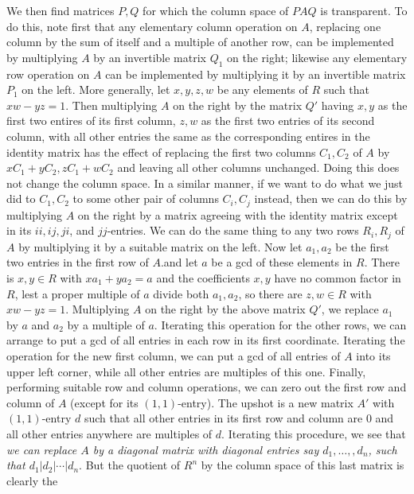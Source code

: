 \documentclass[10pt]{article}
\begin{document}
We then find matrices $P,Q$ for which the column space of $PAQ$ is
transparent. To do this, note first that any elementary column operation
on $A$, replacing one column by the sum of itself and a multiple of
another row, can be implemented by multiplying $A$ by an invertible
matrix $Q_1$ on the right; likewise any elementary row operation on $A$
can be implemented by multiplying it by an invertible matrix $P_1$ on
the left. More generally, let $x,y,z,w$ be any elements of $R$ such that
$xw - yz = 1$. Then multiplying $A$ on the right by the matrix $Q'$
having $x,y$ as the first two entires of its first column, $z,w$ as the
first two entries of its second column, with all other entries the same
as the corresponding entires in the identity matrix has the effect of
replacing the first two columns $C_1,C_2$ of $A$ by
$xC_1+yC_2,zC_1+wC_2$ and leaving all other columns unchanged. Doing
this does not change the column space. In a similar manner, if we want
to do what we just did to $C_1,C_2$ to some other pair of columns
$C_i,C_j$ instead, then we can do this by multiplying $A$ on the right
by a matrix agreeing with the identity matrix except in its $ii,ij,ji$,
and $jj$-entries. We can do the same thing to any two rows $R_i,R_j$ of
$A$ by multiplying it by a suitable matrix on the left. Now let
$a_1,a_2$ be the first two entries in the first row of $A$.and let $a$
be a gcd of these elements in $R$. There is $x,y\in R$ with $xa_1 + ya_2
= a$ and the coefficients $x,y$ have no common factor in $R$, lest a
proper multiple of $a$ divide both $a_1,a_2$, so there are $z,w\in R$
with $xw - yz = 1$. Multiplying $A$ on the right by the above matrix
$Q'$, we replace $a_1$ by $a$ and $a_2$ by a multiple of $a$. Iterating
this operation for the other rows, we can arrange to put a gcd of all
entries in each row in its first coordinate. Iterating the operation for
the new first column, we can put a gcd of all entries of $A$ into its
upper left corner, while all other entries are multiples of this one.
Finally, performing suitable row and column operations, we can zero out
the first row and column of $A$ (except for its $(1,1)$-entry). The
upshot is a new matrix $A'$ with $(1,1)$-entry $d$ such that all other
entries in its first row and column are 0 and all other entries anywhere
are multiples of $d$. Iterating this procedure, we see that {\sl we can
  replace $A$ by a diagonal matrix with diagonal entries say
  $d_1,\ldots,,d_n$, such that $d_1 | d_2 | \cdots | d_n$}. But the
quotient of $R^n$ by the column space of this last matrix is clearly the
\end{document}
